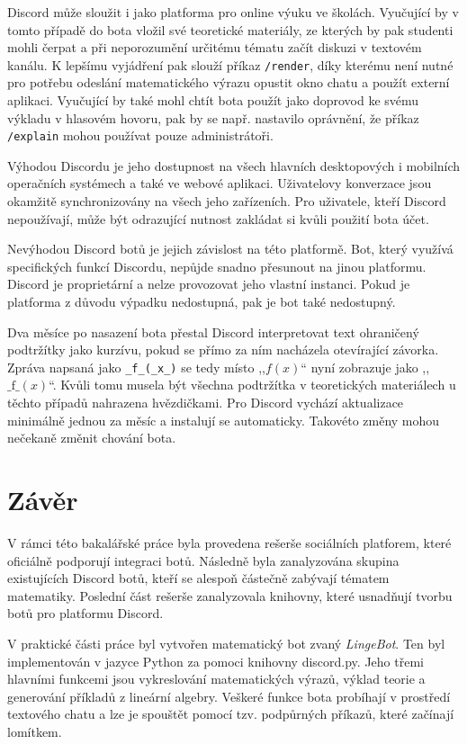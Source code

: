 \documentclass[FM]{tulthesis}
\begin{document}
	Discord může sloužit i jako platforma pro online výuku ve školách. Vyučující by v tomto případě do bota vložil své teoretické materiály, ze kterých by pak studenti mohli čerpat a při neporozumění určitému tématu začít diskuzi v textovém kanálu. K lepšímu vyjádření pak slouží příkaz \verb|/render|, díky kterému není nutné pro potřebu odeslání matematického výrazu opustit okno chatu a použít externí aplikaci. Vyučující by také mohl chtít bota použít jako doprovod ke svému výkladu v hlasovém hovoru, pak by se např. nastavilo oprávnění, že příkaz \verb|/explain| mohou používat pouze administrátoři.
	
	Výhodou Discordu je jeho dostupnost na všech hlavních desktopových i mobilních operačních systémech a také ve webové aplikaci. Uživatelovy konverzace jsou okamžitě synchronizovány na všech jeho zařízeních. Pro uživatele, kteří Discord nepoužívají, může být odrazující nutnost zakládat si kvůli použití bota účet.
	
	Nevýhodou Discord botů je jejich závislost na této platformě. Bot, který využívá specifických funkcí Discordu, nepůjde snadno přesunout na jinou platformu. Discord je proprietární a nelze provozovat jeho vlastní instanci. Pokud je platforma z důvodu výpadku nedostupná, pak je bot také nedostupný.
	
	Dva měsíce po nasazení bota přestal Discord interpretovat text ohraničený podtržítky jako kurzívu, pokud se přímo za ním nacházela otevírající závorka. Zpráva napsaná jako \verb|_f_(_x_)| se tedy místo ,,$f(x)$`` nyní zobrazuje jako ,,$\_\mathrm{f}\_(x)$``. Kvůli tomu musela být všechna podtržítka v teoretických materiálech u těchto případů nahrazena hvězdičkami. Pro Discord vychází aktualizace minimálně jednou za měsíc a instalují se automaticky. Takovéto změny mohou nečekaně změnit chování bota.
	
	\chapter{Závěr}
	
	V rámci této bakalářské práce byla provedena rešerše sociálních platforem, které oficiálně podporují integraci botů. Následně byla zanalyzována skupina existujících Discord botů, kteří se alespoň částečně zabývají tématem matematiky. Poslední část rešerše zanalyzovala knihovny, které usnadňují tvorbu botů pro platformu Discord.
	
	V praktické části práce byl vytvořen matematický bot zvaný \textit{LingeBot}. Ten byl implementován v jazyce Python za pomoci knihovny discord.py. Jeho třemi hlavními funkcemi jsou vykreslování matematických výrazů, výklad teorie a generování příkladů z lineární algebry. Veškeré funkce bota probíhají v prostředí textového chatu a lze je spouštět pomocí tzv. podpůrných příkazů, které začínají lomítkem.
	
\end{document}
